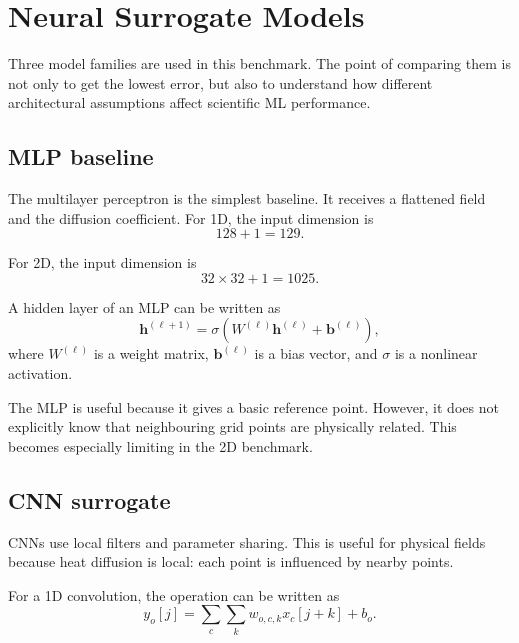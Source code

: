 \documentclass[11pt,a4paper]{article}
\begin{document}
\section{Neural Surrogate Models}

Three model families are used in this benchmark. The point of comparing them is not only to get the lowest error, but also to understand how different architectural assumptions affect scientific ML performance.

\subsection{MLP baseline}

The multilayer perceptron is the simplest baseline. It receives a flattened field and the diffusion coefficient. For 1D, the input dimension is
\begin{equation}
    128 + 1 = 129.
\end{equation}

For 2D, the input dimension is
\begin{equation}
    32 \times 32 + 1 = 1025.
\end{equation}

A hidden layer of an MLP can be written as
\begin{equation}
    \bm{h}^{(\ell+1)}
    =
    \sigma
    \left(
    W^{(\ell)}
    \bm{h}^{(\ell)}
    +
    \bm{b}^{(\ell)}
    \right),
\end{equation}
where \(W^{(\ell)}\) is a weight matrix, \(\bm{b}^{(\ell)}\) is a bias vector, and \(\sigma\) is a nonlinear activation.

The MLP is useful because it gives a basic reference point. However, it does not explicitly know that neighbouring grid points are physically related. This becomes especially limiting in the 2D benchmark.

\subsection{CNN surrogate}

CNNs use local filters and parameter sharing. This is useful for physical fields because heat diffusion is local: each point is influenced by nearby points.

For a 1D convolution, the operation can be written as
\begin{equation}
    y_o[j]
    =
    \sum_c
    \sum_k
    w_{o,c,k}
    x_c[j+k]
    +
    b_o.
\end{equation}
\end{document}
